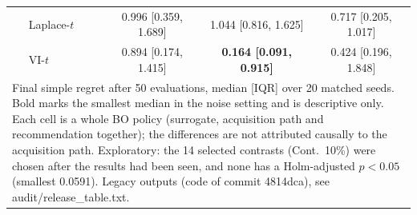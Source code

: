 \begin{tabular}{llccc}
 & Laplace-$t$ & 0.996 [0.359, 1.689] & 1.044 [0.816, 1.625] & 0.717 [0.205, 1.017] \\
 & VI-$t$ & 0.894 [0.174, 1.415] & \textbf{0.164 [0.091, 0.915]} & 0.424 [0.196, 1.848] \\
\bottomrule
\multicolumn{5}{p{14cm}}{\footnotesize Final simple regret after 50 evaluations, median [IQR] over 20 matched seeds. Bold marks the smallest median in the noise setting and is descriptive only. Each cell is a whole BO policy (surrogate, acquisition path and recommendation together); the differences are not attributed causally to the acquisition path. Exploratory: the 14 selected contrasts (Cont.~10\%) were chosen after the results had been seen, and none has a Holm-adjusted $p<0.05$ (smallest 0.0591). Legacy outputs (code of commit 4814dca), see audit/release\_table.txt.} \\
\end{tabular}

